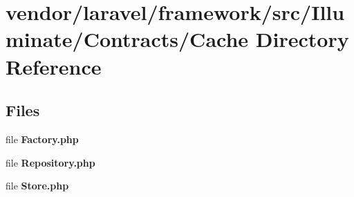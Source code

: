 \section{vendor/laravel/framework/src/\+Illuminate/\+Contracts/\+Cache Directory Reference}
\label{dir_1bbd6c5ce576477baf76476fa4026a6d}
\subsection*{Files}
\begin{DoxyCompactItemize}
\item 
file {\bf Factory.\+php}
\item 
file {\bf Repository.\+php}
\item 
file {\bf Store.\+php}
\end{DoxyCompactItemize}
